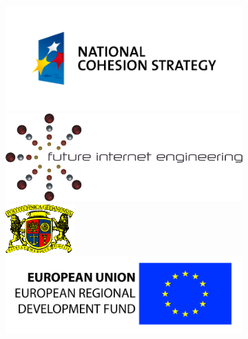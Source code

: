 \begin{figure}[ht]
\begin{minipage}[b]{0.33\linewidth}
\begin{figure}[ht]
\begin{minipage}[b]{0.27\textwidth}
\centering
\vspace*{\fill}
\includegraphics[scale=0.45]{logo-nss}
\vspace*{\fill}
\end{minipage}
\begin{minipage}[b]{0.28\textwidth}
\centering
\includegraphics[scale=0.7]{logo-iip}
\end{minipage}
\begin{minipage}[b]{0.16\textwidth}
\centering
\includegraphics[scale=0.6]{logo-pg}
\end{minipage}
\begin{minipage}[b]{0.26\textwidth}
\centering
\includegraphics[scale=0.75]{logo-eu}
\end{minipage}
\end{figure}


\end{minipage}
\end{figure}
